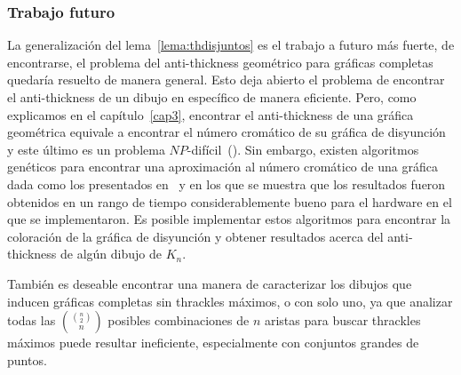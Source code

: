 \subsubsection{Trabajo futuro}

La generalización del lema~\ref{lema:thdisjuntos} es el trabajo a futuro más fuerte, de encontrarse, el
problema del anti-thickness geométrico para gráficas completas quedaría resuelto de manera general. Esto
deja abierto el problema de encontrar el anti-thickness de un dibujo en específico de manera eficiente.
Pero, como explicamos en el capítulo~\ref{cap3}, encontrar el anti-thickness de una gráfica geométrica equivale a encontrar el número cromático de su gráfica de disyunción y este último es un problema $NP$-difícil~(\cite{Skiena2003}). Sin embargo, existen algoritmos genéticos para encontrar una aproximación al número cromático de una gráfica dada como los presentados en~\cite{Fleurent1996} y \cite{Galinier1999} en los que se muestra que los resultados fueron obtenidos en un rango de tiempo considerablemente bueno para el hardware en el que se implementaron. Es posible implementar estos algoritmos para encontrar la coloración de la gráfica de disyunción y obtener resultados acerca del anti-thickness de algún dibujo de $K_n$.

También es deseable encontrar una manera de caracterizar los dibujos que inducen gráficas completas sin
thrackles máximos, o con solo uno, ya que analizar todas las $\displaystyle \binom{\binom{n}{2}}{n}$
posibles combinaciones de $n$ aristas para buscar thrackles máximos puede resultar ineficiente,
especialmente con conjuntos grandes de puntos.
